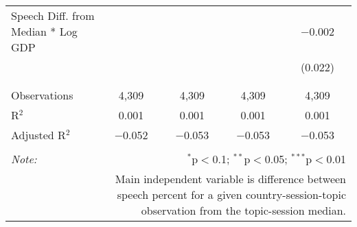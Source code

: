 \begin{table}[!htbp]
\begin{tabular}{@{\extracolsep{5pt}}lcccc}
 Speech Diff. from Median * Log GDP &  &  &  & $-$0.002 \\ 
  &  &  &  & (0.022) \\ 
  & & & & \\ 
\hline \\[-1.8ex] 
Observations & 4,309 & 4,309 & 4,309 & 4,309 \\ 
R$^{2}$ & 0.001 & 0.001 & 0.001 & 0.001 \\ 
Adjusted R$^{2}$ & $-$0.052 & $-$0.053 & $-$0.053 & $-$0.053 \\ 
\hline 
\hline \\[-1.8ex] 
\textit{Note:}  & \multicolumn{4}{r}{$^{*}$p$<$0.1; $^{**}$p$<$0.05; $^{***}$p$<$0.01} \\ 
 & \multicolumn{4}{r}{Main independent variable is difference between speech percent for a given country-session-topic observation from the topic-session median.} \\ 
\end{tabular} 
\end{table} 
